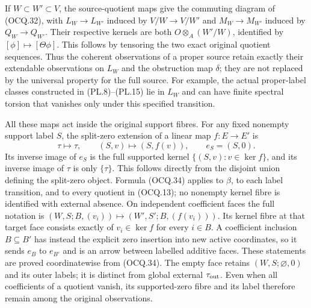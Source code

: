 If $W\subset W'\subset V$, the source-quotient maps give the commuting
diagram of (OCQ.32), with
$L_W\to L_{W'}$ induced by $V/W\to V/W'$ and
$M_W\to M_{W'}$ induced by $Q_W\to Q_{W'}$.
Their respective kernels are both
$O\otimes_A(W'/W)$, identified by $[\phi]\mapsto[\Theta\phi]$.
This follows by tensoring the two exact original quotient sequences.
Thus the coherent observations of a proper source retain exactly their
extendable observations on $L_W$ and the obstruction map $\delta$;
they are not replaced by the universal property for the full source.
For example, the actual proper-label classes constructed in
(PL.8)--(PL.15) lie in $L_W$ and can have finite spectral torsion that
vanishes only under this specified transition.

All these maps act inside the original support fibres.  For any fixed
nonempty support label $S$, the split-zero extension of a linear map
$f:E\to E'$ is
\[
 \tau\longmapsto\tau,\qquad
 (S,v)\longmapsto(S,f(v)),\qquad e_S=(S,0).                   \tag{OCQ.34}
\]
Its inverse image of $e_S$ is the full supported kernel
$\{(S,v):v\in\ker f\}$, and its inverse image of $\tau$ is only
$\{\tau\}$.  This follows directly from the disjoint union defining
the split-zero object.  Formula (OCQ.34) applies to $\beta$, to each
label transition, and to every quotient in (OCQ.13); no nonempty
kernel fibre is identified with external absence.
On independent coefficient faces the full notation is
$(W,S;B,(v_i))\mapsto(W',S';B,(f(v_i)))$. Its kernel fibre
at that target face consists exactly of $v_i\in\ker f$ for every
$i\in B$. A coefficient inclusion $B\subseteq B'$ has instead
the explicit zero insertion into new active coordinates, so it sends
$e_B$ to $e_{B'}$ and is an arrow between labelled additive faces.
These statements are proved coordinatewise from (OCQ.34).
The empty face retains $(W,S;\varnothing,0)$ and its outer labels;
it is distinct from global external $\tau_{\rm out}$. Even when all
coefficients of a quotient vanish, its supported-zero fibre and its
label therefore remain among the original observations.

